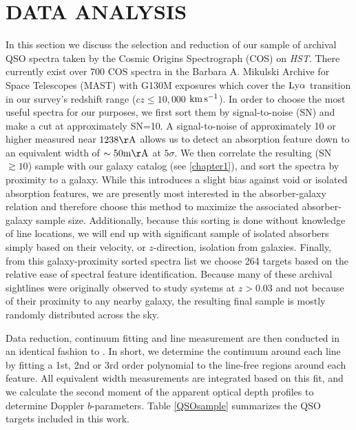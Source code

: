\documentclass[twocolumn,tighten]{aastex62}
\newcommand{\kms}{$\rm km\, s^{-1}$}
\begin{document}
\section{DATA ANALYSIS}
In this section we discuss the selection and reduction of our sample of archival QSO spectra taken by the Cosmic Origins Spectrograph (COS) on \textit{HST}. There currently exist over 700 COS spectra in the Barbara A. Mikulski Archive for Space Telescopes (MAST) with G130M exposures which cover the $\rm Ly\alpha$ transition in our survey's redshift range ($cz \leq 10,000$ \kms). In order to choose the most useful spectra for our purposes, we first sort them by signal-to-noise (SN) and make a cut at approximately SN=10. A signal-to-noise of approximately 10 or higher measured near $\rm 1238 \AA$ allows us to detect an absorption feature down to an equivalent width of $\rm \sim 50 m\AA$ at $5\sigma$. We then correlate the resulting (SN$\gtrsim 10$) sample with our galaxy catalog (see \ref{chapter1}), and sort the spectra by proximity to a galaxy. While this introduces a slight bias against void or isolated absorption features, we are presently most interested in the absorber-galaxy relation and therefore choose this method to maximize the associated absorber-galaxy sample size. Additionally, because this sorting is done without knowledge of line locations, we will end up with significant sample of isolated absorbers simply based on their velocity, or $z$-direction, isolation from galaxies. Finally, from this galaxy-proximity sorted spectra list we choose 264 targets based on the relative ease of spectral feature identification. Because many of these archival sightlines were originally observed to study systems at $z > 0.03$ and not because of their proximity to any nearby galaxy, the resulting final sample is mostly randomly distributed across the sky.

Data reduction, continuum fitting and line measurement are then conducted in an identical fashion to \cite{french2017}. In short, we determine the continuum around each line by fitting a 1st, 2nd or 3rd order polynomial to the line-free regions around each feature. All equivalent width measurements are integrated based on this fit, and we calculate the second moment of the apparent optical depth profiles to determine Doppler $b$-parameters. Table \ref{QSOsample} summarizes the QSO targets included in this work.
\end{document}
